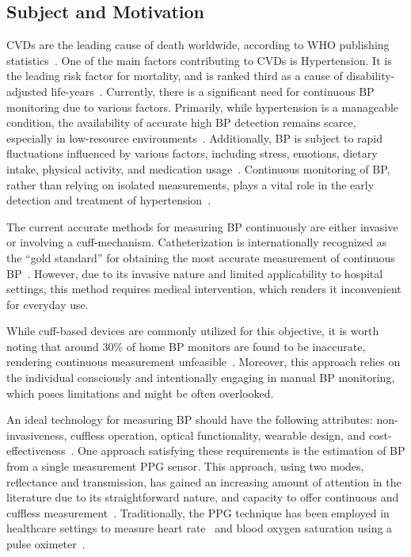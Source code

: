 \subsection{Subject and Motivation}
\label{subsec:subject_motivation}

\ac{CVDs} are the leading cause of death worldwide, according to WHO publishing statistics~\cite{WorldHealthStatistics2023}.
One of the main factors contributing to CVDs is Hypertension.
It is the leading risk factor for mortality, and is ranked third as a cause of disability-adjusted life-years~\cite{ezzatiSelectedMajorRisk2002}.
Currently, there is a significant need for continuous \ac{BP} monitoring due to various factors.
Primarily, while hypertension is a manageable condition, the availability of accurate high BP detection remains scarce, especially in low-resource environments~\cite{burtPrevalenceHypertensionUS1995}.
Additionally, BP is subject to rapid fluctuations influenced by various factors, including stress, emotions, dietary intake, physical activity, and medication usage~\cite{poonCufflessNoninvasiveMeasurements2005}.
Continuous monitoring of BP, rather than relying on isolated measurements, plays a vital role in the early detection and treatment of hypertension~\cite{el-hajjDeepLearningModels2021}.

The current accurate methods for measuring BP continuously are either invasive or involving a cuff-mechanism.
Catheterization is internationally recognized as the \enquote{gold standard} for obtaining the most accurate measurement of continuous BP~\cite{sharmaCuffLessContinuousBlood2017}.
However, due to its invasive nature and limited applicability to hospital settings, this method requires medical intervention, which renders it inconvenient for everyday use.

While cuff-based devices are commonly utilized for this objective, it is worth noting that around 30\% of home BP monitors are found to be inaccurate, rendering continuous measurement unfeasible~\cite{leungHypertensionCanada20162016, seboBloodPressureMeasurements2014}.
Moreover, this approach relies on the individual consciously and intentionally engaging in manual BP monitoring, which poses limitations and might be often overlooked.

An ideal technology for measuring BP should have the following attributes: non-invasiveness, cuffless operation, optical functionality, wearable design, and cost-effect\-iveness~\cite{el-hajjDeepLearningModels2021}.
One approach satisfying these requirements is the estimation of BP from a single measurement \ac{PPG} sensor.
This approach, using two modes, reflectance and transmission, has gained an increasing amount of attention in the literature due to its straightforward nature, and capacity to offer continuous and cuffless measurement~\cite{el-hajjDeepLearningModels2021}.
Traditionally, the PPG technique has been employed in healthcare settings to measure heart rate~\cite{reyesWirelessPhotoplethysmographicDevice2012} and blood oxygen saturation using a pulse oximeter~\cite{yoonMultipleDiagnosisBased2002}.

